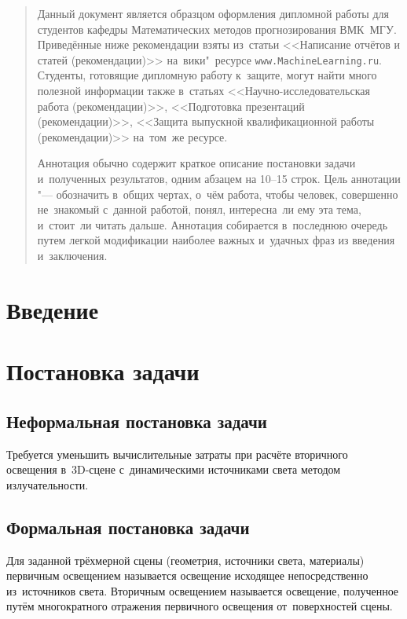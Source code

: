 \documentclass[12pt,fleqn]{article}
\begin{document}
\newpage
\renewcommand{\contentsname}{Содержание}
\tableofcontents

\newpage
\begin{abstract}
    Данный документ является образцом оформления дипломной работы для студентов кафедры 
    Математических методов прогнозирования ВМК~МГУ. 
    Приведённые ниже рекомендации взяты из~статьи
    <<Написание отчётов и статей (рекомендации)>>
    на~вики"~ресурсе \texttt{www.MachineLearning.ru}.
    Студенты, готовящие дипломную работу к~защите, 
    могут найти много полезной информации также в~статьях 
    <<Научно-исследовательская работа (рекомендации)>>,
    <<Подготовка презентаций (рекомендации)>>,
    <<Защита выпускной квалификационной работы (рекомендации)>>
    на~том~же ресурсе. 

    Аннотация обычно содержит 
    краткое описание постановки задачи и~полученных результатов,
    одним абзацем на 10--15 строк.
    Цель аннотации "--- обозначить в~общих чертах, о~чём работа,
    чтобы человек, совершенно не~знакомый с~данной работой,
    понял, интересна~ли ему эта тема, и~стоит~ли читать дальше.
    Аннотация собирается в~последнюю очередь
    путем легкой модификации наиболее важных и~удачных фраз из введения и~заключения.
\end{abstract}

\newpage
\section{Введение}

\section{Постановка задачи}

\subsection{Неформальная постановка задачи}

Требуется уменьшить вычислительные затраты при расчёте вторичного освещения в~3D-сцене с~динамическими источниками света методом излучательности.

\subsection{Формальная постановка задачи}

Для заданной трёхмерной сцены (геометрия, источники света, материалы) первичным освещением называется освещение исходящее непосредственно из~источников света. Вторичным освещением называется освещение, полученное путём многократного отражения первичного освещения от~поверхностей сцены.
\end{document}
